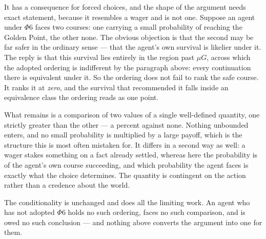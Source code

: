 \documentclass[11pt]{article}
\numberwithin{equation}{section}
\theoremstyle{plain}
\theoremstyle{definition}
\theoremstyle{remark}
\begin{document}
It has a consequence for forced choices, and the shape of the argument
needs exact statement, because it resembles a wager and is not one. Suppose an agent under $\Phi6$ faces two courses: one carrying a small
probability of reaching the Golden Point, the other none. The obvious
objection is that the second may be far safer in the ordinary sense ---
that the agent's own survival is likelier under it. The reply is that
this survival lies entirely in the region past $\mu G$, across which the
adopted ordering is indifferent by the paragraph above: every
continuation there is equivalent under it. So the ordering does not fail
to rank the safe course. It ranks it at \emph{zero}, and the survival
that recommended it falls inside an equivalence class the ordering reads
as one point.

What remains is a comparison of two values of a single well-defined
quantity, one strictly greater than the other --- a percent against
none. Nothing unbounded enters, and no small probability is multiplied
by a large payoff, which is the structure this is most often mistaken
for. It differs in a second way as well: a wager stakes something on a
fact already settled, whereas here the probability is of the agent's own
course succeeding, and which probability the agent faces is exactly what
the choice determines. The quantity is contingent on the action rather
than a credence about the world.

The conditionality is unchanged and does all the limiting work. An agent
who has not adopted $\Phi6$ holds no such ordering, faces no such
comparison, and is owed no such conclusion --- and nothing above
converts the argument into one for them.
\end{document}
